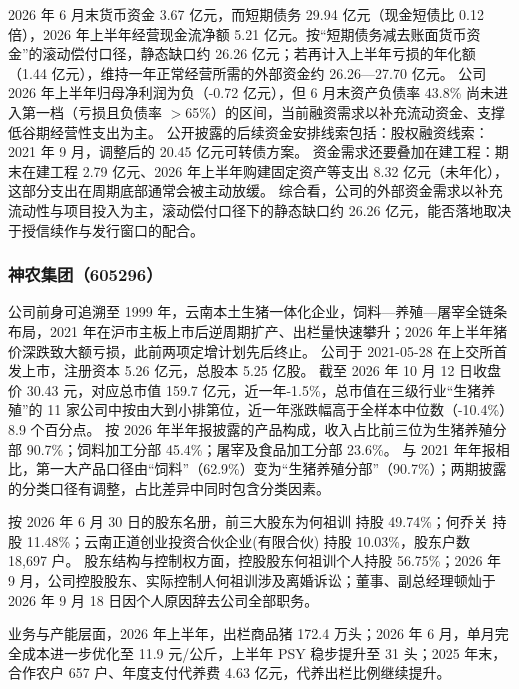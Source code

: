  2026 年 6 月末货币资金 3.67 亿元，而短期债务 29.94 亿元（现金短债比 0.12 倍），2026 年上半年经营现金流净额 5.21 亿元。按“短期债务减去账面货币资金”的滚动偿付口径，静态缺口约 26.26 亿元；若再计入上半年亏损的年化额（1.44 亿元），维持一年正常经营所需的外部资金约 26.26---27.70 亿元。 公司 2026 年上半年归母净利润为负（-0.72 亿元），但 6 月末资产负债率 43.8\% 尚未进入第一档（亏损且负债率 $>$65\%）的区间，当前融资需求以补充流动资金、支撑低谷期经营性支出为主。 公开披露的后续资金安排线索包括：股权融资线索：2021 年 9 月，调整后的 20.45 亿元可转债方案。 资金需求还要叠加在建工程：期末在建工程 2.79 亿元、2026 年上半年购建固定资产等支出 8.32 亿元（未年化），这部分支出在周期底部通常会被主动放缓。 综合看，公司的外部资金需求以补充流动性与项目投入为主，滚动偿付口径下的静态缺口约 26.26 亿元，能否落地取决于授信续作与发行窗口的配合。




\subsubsection{神农集团（605296）}
\label{co:605296}

 公司前身可追溯至 1999 年，云南本土生猪一体化企业，饲料—养殖—屠宰全链条布局，2021 年在沪市主板上市后逆周期扩产、出栏量快速攀升；2026 年上半年猪价深跌致大额亏损，此前两项定增计划先后终止。 公司于 2021-05-28 在上交所首发上市，注册资本 5.26 亿元，总股本 5.25 亿股。 截至 2026 年 10 月 12 日收盘价 30.43 元，对应总市值 159.7 亿元，近一年-1.5\%，总市值在三级行业“生猪养殖”的 11 家公司中按由大到小排第位，近一年涨跌幅高于全样本中位数（-10.4\%）8.9 个百分点。 按 2026 年半年报披露的产品构成，收入占比前三位为生猪养殖分部 90.7\%；饲料加工分部 45.4\%；屠宰及食品加工分部 23.6\%。 与 2021 年年报相比，第一大产品口径由“饲料”（62.9\%）变为“生猪养殖分部”（90.7\%）；两期披露的分类口径有调整，占比差异中同时包含分类因素。

 按 2026 年 6 月 30 日的股东名册，前三大股东为何祖训 持股 49.74\%；何乔关 持股 11.48\%；云南正道创业投资合伙企业(有限合伙) 持股 10.03\%，股东户数 18,697 户。 股东结构与控制权方面，控股股东何祖训个人持股 56.75\%；2026 年 9 月，公司控股股东、实际控制人何祖训涉及离婚诉讼；董事、副总经理顿灿于 2026 年 9 月 18 日因个人原因辞去公司全部职务。

 业务与产能层面，2026 年上半年，出栏商品猪 172.4 万头；2026 年 6 月，单月完全成本进一步优化至 11.9 元/公斤，上半年 PSY 稳步提升至 31 头；2025 年末，合作农户 657 户、年度支付代养费 4.63 亿元，代养出栏比例继续提升。

